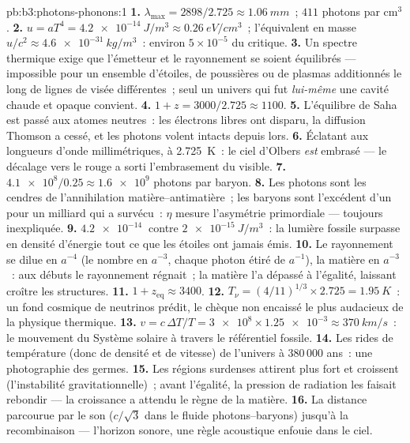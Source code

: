 \begin{solution}{pb:b3:photons-phonons:1}
\textbf{1.} $\lambda_{\max} = 2898/2.725 \approx \qty{1.06}{mm}$~;
$411$ photons par cm$^3$.
\textbf{2.} $u = aT^4 = \qty{4.2e-14}{J/m^3} \approx
\qty{0.26}{eV/cm^3}$~; l'équivalent en masse $u/c^2 \approx
\qty{4.6e-31}{kg/m^3}$~: environ $5\times10^{-5}$ du critique.
\textbf{3.} Un spectre thermique exige que l'émetteur et le
rayonnement se soient équilibrés --- impossible pour un ensemble
d'étoiles, de poussières ou de plasmas additionnés le long de
lignes de visée différentes~; seul un univers qui fut
\emph{lui-même} une cavité chaude et opaque convient.
\textbf{4.} $1 + z = 3000/2.725 \approx 1100$.
\textbf{5.} L'équilibre de Saha est passé aux atomes neutres~: les
électrons libres ont disparu, la diffusion Thomson a cessé, et les
photons volent intacts depuis lors.
\textbf{6.} Éclatant aux longueurs d'onde millimétriques, à
\qty{2.725}{K}~: le ciel d'Olbers \emph{est} embrasé --- le
décalage vers le rouge a sorti l'embrasement du visible.
\textbf{7.} $\num{4.1e8}/0.25 \approx \num{1.6e9}$ photons par
baryon.
\textbf{8.} Les photons sont les cendres de l'annihilation
matière--antimatière~; les baryons sont l'excédent d'un pour un
milliard qui a survécu~: $\eta$ mesure l'asymétrie primordiale ---
toujours inexpliquée.
\textbf{9.} $\qty{4.2e-14}{}$ contre $\qty{2e-15}{J/m^3}$~: la
lumière fossile surpasse en densité d'énergie tout ce que les
étoiles ont jamais émis.
\textbf{10.} Le rayonnement se dilue en $a^{-4}$ (le nombre en
$a^{-3}$, chaque photon étiré de $a^{-1}$), la matière en
$a^{-3}$~: aux débuts le rayonnement régnait~; la matière l'a
dépassé à l'égalité, laissant croître les structures.
\textbf{11.} $1 + z_{\text{eq}} \approx 3400$.
\textbf{12.} $T_\nu = (4/11)^{1/3} \times 2.725 =
\qty{1.95}{K}$~: un fond cosmique de neutrinos prédit, le chèque
non encaissé le plus audacieux de la physique thermique.
\textbf{13.} $v = c\,\Delta T/T = \num{3e8} \times \num{1.25e-3}
\approx \qty{370}{km/s}$~: le mouvement du Système solaire à
travers le référentiel fossile.
\textbf{14.} Les rides de température (donc de densité et de
vitesse) de l'univers à 380\,000 ans~: une photographie des
germes.
\textbf{15.} Les régions surdenses attirent plus fort et
croissent (l'instabilité gravitationnelle)~; avant l'égalité, la
pression de radiation les faisait rebondir --- la croissance a
attendu le règne de la matière.
\textbf{16.} La distance parcourue par le son ($c/\sqrt3$ dans le
fluide photons--baryons) jusqu'à la recombinaison --- l'horizon
sonore, une règle acoustique enfouie dans le ciel.

\end{solution}
